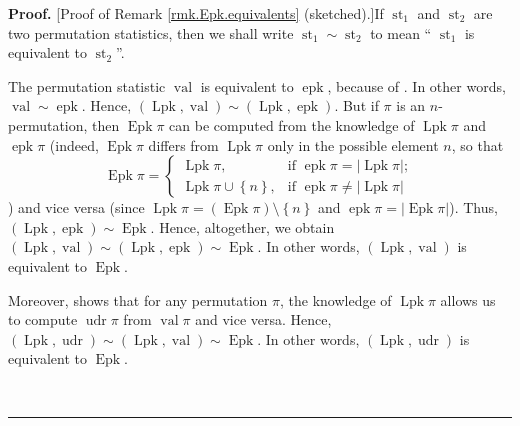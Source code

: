 \documentclass[numbers=enddot,12pt,final,onecolumn,notitlepage]{scrartcl}%
\theoremstyle{definition}
\newenvironment{proof}[1][Proof]{\noindent\textbf{#1.} }{\ \rule{0.5em}{0.5em}}
\begin{document}
\begin{proof}
[Proof of Remark \ref{rmk.Epk.equivalents} (sketched).]If $\operatorname*{st}%
\nolimits_{1}$ and $\operatorname*{st}\nolimits_{2}$ are two permutation
statistics, then we shall write $\operatorname*{st}\nolimits_{1}%
\sim\operatorname*{st}\nolimits_{2}$ to mean \textquotedblleft%
$\operatorname*{st}\nolimits_{1}$ is equivalent to $\operatorname*{st}%
\nolimits_{2}$\textquotedblright.

The permutation statistic $\operatorname*{val}$ is equivalent to
$\operatorname*{epk}$, because of \cite[Lemma 2.1 \textbf{(e)}]{part1}. In
other words, $\operatorname*{val}\sim\operatorname*{epk}$. Hence, $\left(
\operatorname*{Lpk},\operatorname*{val}\right)  \sim\left(
\operatorname*{Lpk},\operatorname*{epk}\right)  $. But if $\pi$ is an
$n$-permutation, then $\operatorname*{Epk}\pi$ can be computed from the
knowledge of $\operatorname*{Lpk}\pi$ and $\operatorname*{epk}\pi$ (indeed,
$\operatorname*{Epk}\pi$ differs from $\operatorname*{Lpk}\pi$ only in the
possible element $n$, so that
\[
\operatorname*{Epk}\pi=%
\begin{cases}
\operatorname*{Lpk}\pi, & \text{if }\operatorname*{epk}\pi=\left\vert
\operatorname*{Lpk}\pi\right\vert ;\\
\operatorname*{Lpk}\pi\cup\left\{  n\right\}  , & \text{if }%
\operatorname*{epk}\pi\neq\left\vert \operatorname*{Lpk}\pi\right\vert
\end{cases}
\]
) and vice versa (since $\operatorname*{Lpk}\pi=\left(  \operatorname*{Epk}%
\pi\right)  \setminus\left\{  n\right\}  $ and $\operatorname*{epk}%
\pi=\left\vert \operatorname*{Epk}\pi\right\vert $). Thus, $\left(
\operatorname*{Lpk},\operatorname*{epk}\right)  \sim\operatorname*{Epk}$.
Hence, altogether, we obtain $\left(  \operatorname*{Lpk},\operatorname*{val}%
\right)  \sim\left(  \operatorname*{Lpk},\operatorname*{epk}\right)
\sim\operatorname*{Epk}$. In other words, $\left(  \operatorname*{Lpk}%
,\operatorname*{val}\right)  $ is equivalent to $\operatorname*{Epk}$.

Moreover, \cite[Theorem 3.2]{part1} shows that for any permutation $\pi$, the
knowledge of $\operatorname*{Lpk}\pi$ allows us to compute
$\operatorname*{udr}\pi$ from $\operatorname*{val}\pi$ and vice versa. Hence,
$\left(  \operatorname*{Lpk},\operatorname*{udr}\right)  \sim\left(
\operatorname*{Lpk},\operatorname*{val}\right)  \sim\operatorname*{Epk}$. In
other words, $\left(  \operatorname*{Lpk},\operatorname*{udr}\right)  $ is
equivalent to $\operatorname*{Epk}$.


\end{proof}
\end{document}

